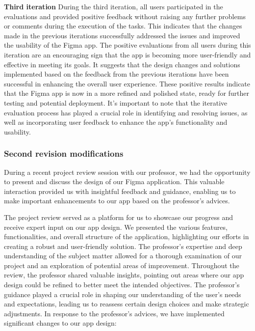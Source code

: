 \documentclass{article}
\begin{document}
\textbf{Third iteration} \newline
During the third iteration, all users participated in the evaluations and provided positive feedback without raising any further problems or comments during the execution of the tasks. This indicates that the changes made in the previous iterations successfully addressed the issues and improved the usability of the Figma app. The positive evaluations from all users during this iteration are an encouraging sign that the app is becoming more user-friendly and effective in meeting its goals. It suggests that the design changes and solutions implemented based on the feedback from the previous iterations have been successful in enhancing the overall user experience. These positive results indicate that the Figma app is now in a more refined and polished state, ready for further testing and potential deployment. It's important to note that the iterative evaluation process has played a crucial role in identifying and resolving issues, as well as incorporating user feedback to enhance the app's functionality and usability.

\newpage

\subsubsection{Second revision modifications}

During a recent project review session with our professor, we had the opportunity to present and discuss the design of our Figma application. This valuable interaction provided us with insightful feedback and guidance, enabling us to make important enhancements to our app based on the professor's advices.

The project review served as a platform for us to showcase our progress and receive expert input on our app design. We presented the various features, functionalities, and overall structure of the application, highlighting our efforts in creating a robust and user-friendly solution. The professor's expertise and deep understanding of the subject matter allowed for a thorough examination of our project and an exploration of potential areas of improvement. Throughout the review, the professor shared valuable insights, pointing out areas where our app design could be refined to better meet the intended objectives. The professor's guidance played a crucial role in shaping our understanding of the user's needs and expectations, leading us to reassess certain design choices and make strategic adjustments. In response to the professor's advices, we have implemented significant changes to our app design:
\end{document}
